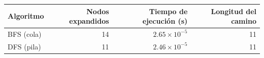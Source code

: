\begin{tabular}{@{}lrrr@{}}
\toprule
Algoritmo & Nodos expandidos & Tiempo de ejecución (s) & Longitud del camino \\
\midrule
BFS (cola) & 14 & $2.65\times10^{-5}$ & 11 \\
DFS (pila) & 11 & $2.46\times10^{-5}$ & 11 \\
\bottomrule
\end{tabular}
